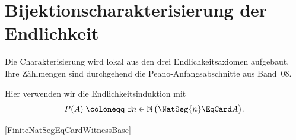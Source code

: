 \documentclass[main.tex]{subfiles}
\begin{document}
\section{Bijektionscharakterisierung der Endlichkeit}

Die Charakterisierung wird lokal aus den drei Endlichkeitsaxiomen aufgebaut.
Ihre Zählmengen sind durchgehend die Peano-Anfangsabschnitte aus Band~08.

Hier verwenden wir die Endlichkeitsinduktion mit
\[
  P(A)\;\coloneqq\;
  \exists n\in\mathbb{N}\,\bigl(\NatSeg{n}\EqCard A\bigr).
\]
\begin{tabproofsplitwide}
  [FiniteNatSegEqCardWitnessBase]
  \closeproofpartwideindR


\end{tabproofsplitwide}
\end{document}

